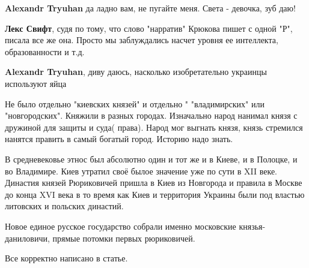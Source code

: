 \begin{itemize}
\begin{itemize}
\textbf{Alexandr Tryuhan} да ладно вам, не пугайте меня. Света - девочка, зуб даю! \Smiley[1.0][yellow]

 
\textbf{Лекс Свифт}, судя по тому, что слово "нарратив" Крюкова пишет с одной "Р", писала все же она. Просто мы заблуждались насчет уровня ее интеллекта, образованности и т.д.

 
\textbf{Alexandr Tryuhan}, диву даюсь, насколько изобретательно украинцы используют яйца
\end{itemize}

 
Не было отдельно "киевских князей" и отдельно " "владимирских" или
"новгородских". Княжили в разных городах. Изначально народ нанимал князя с
дружиной для защиты и суда( права). Народ мог выгнать князя, князь стремился
нанятся править в самый богатый город. Историю надо знать.


В средневековье этнос был абсолютно один и тот же и в Киеве, и в Полоцке, и во
Владимире. Киев утратил своё былое значение уже по сути в XII веке. Династия
князей Рюриковичей пришла в Киев из Новгорода и правила в Москве до конца XVI
века в то время как Киев и территория Украины были под властью литовских и
польских династий.

Новое единое русское государство собрали именно московские князья-даниловичи,
прямые потомки первых рюриковичей.

Все корректно написано в статье.

\begin{itemize}
 

\end{itemize}
\end{itemize}
